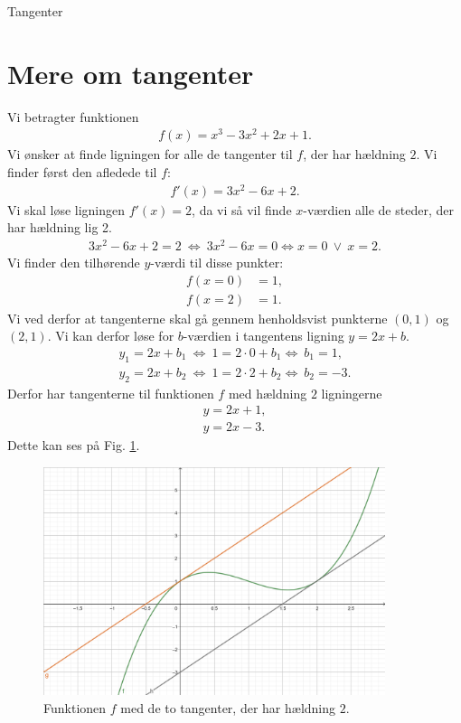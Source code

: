 \begin{center}
\Huge
Tangenter
\end{center}
\section*{Mere om tangenter}
\begin{exa}
Vi betragter funktionen 
\begin{align*}
f(x) = x^3-3x^2+2x+1.
\end{align*}
Vi ønsker at finde ligningen for alle de tangenter til $f$, der har hældning $2$. Vi finder først den afledede til $f$:
\begin{align*}
f'(x) = 3x^2-6x+2.
\end{align*}
Vi skal løse ligningen $f'(x)=2$, da vi så vil finde $x$-værdien alle de steder, der har hældning lig 2.
\begin{align*}
3x^2-6x+2 = 2\  \Leftrightarrow \ 3x^2-6x=0 \Leftrightarrow x=0 \ \vee \ x = 2.
\end{align*}
Vi finder den tilhørende $y$-værdi til disse punkter:
\begin{align*}
f(x=0) &= 1,\\
f(x=2) &= 1.
\end{align*}
Vi ved derfor at tangenterne skal gå gennem henholdsvist punkterne $(0,1)$ og $(2,1)$. Vi kan derfor løse for $b$-værdien i tangentens ligning $y = 2x+b$.
\begin{align*}
y_1 = 2x+b_1 \ \Leftrightarrow\  1 = 2\cdot 0 + b_1 \Leftrightarrow\  b_1 = 1,\\
y_2 = 2x+b_2 \ \Leftrightarrow\  1 = 2\cdot 2 + b_2 \Leftrightarrow\  b_2 = -3.
\end{align*} 
Derfor har tangenterne til funktionen $f$ med hældning $2$ ligningerne 
\begin{align*}
y = 2x+1,\\
y = 2x -3.
\end{align*}
Dette kan ses på Fig. \ref{fig:dobbelttangent}.
\begin{figure}[H]
\includegraphics[width = 10cm]{Billeder/dobbelttangent.png}
\centering
\caption{Funktionen $f$ med de to tangenter, der har hældning $2$.}
\label{fig:dobbelttangent}
\end{figure}
\end{exa}

